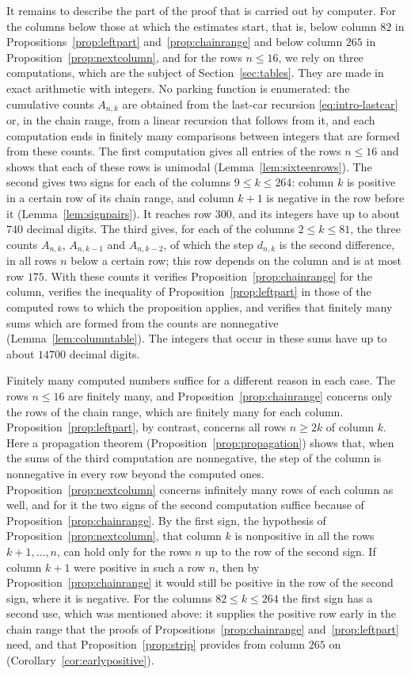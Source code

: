 \documentclass{amsart}
\theoremstyle{definition}
\theoremstyle{remark}
\numberwithin{equation}{section}
\begin{document}
It remains to describe the part of the proof that is carried out by computer. For the columns below those at which the estimates start, that is, below column $82$ in Propositions~\ref{prop:leftpart} and~\ref{prop:chainrange} and below column $265$ in Proposition~\ref{prop:nextcolumn}, and for the rows $n\le 16$, we rely on three computations, which are the subject of Section~\ref{sec:tables}. They are made in exact arithmetic with integers. No parking function is enumerated: the cumulative counts $A_{n,k}$ are obtained from the last-car recursion \eqref{eq:intro-lastcar} or, in the chain range, from a linear recursion that follows from it, and each computation ends in finitely many comparisons between integers that are formed from these counts. The first computation gives all entries of the rows $n\le 16$ and shows that each of these rows is unimodal (Lemma~\ref{lem:sixteenrows}). The second gives two signs for each of the columns $9\le k\le 264$: column $k$ is positive in a certain row of its chain range, and column $k+1$ is negative in the row before it (Lemma~\ref{lem:signpairs}). It reaches row $300$, and its integers have up to about $740$ decimal digits. The third gives, for each of the columns $2\le k\le 81$, the three counts $A_{n,k}$, $A_{n,k-1}$ and $A_{n,k-2}$, of which the step $d_{n,k}$ is the second difference, in all rows $n$ below a certain row; this row depends on the column and is at most row $175$. With these counts it verifies Proposition~\ref{prop:chainrange} for the column, verifies the inequality of Proposition~\ref{prop:leftpart} in those of the computed rows to which the proposition applies, and verifies that finitely many sums which are formed from the counts are nonnegative (Lemma~\ref{lem:columntable}). The integers that occur in these sums have up to about $14700$ decimal digits.

Finitely many computed numbers suffice for a different reason in each case. The rows $n\le 16$ are finitely many, and Proposition~\ref{prop:chainrange} concerns only the rows of the chain range, which are finitely many for each column. Proposition~\ref{prop:leftpart}, by contrast, concerns all rows $n\ge 2k$ of column $k$. Here a propagation theorem (Proposition~\ref{prop:propagation}) shows that, when the sums of the third computation are nonnegative, the step of the column is nonnegative in every row beyond the computed ones. Proposition~\ref{prop:nextcolumn} concerns infinitely many rows of each column as well, and for it the two signs of the second computation suffice because of Proposition~\ref{prop:chainrange}. By the first sign, the hypothesis of Proposition~\ref{prop:nextcolumn}, that column $k$ is nonpositive in all the rows $k+1,\dots,n$, can hold only for the rows $n$ up to the row of the second sign. If column $k+1$ were positive in such a row $n$, then by Proposition~\ref{prop:chainrange} it would still be positive in the row of the second sign, where it is negative. For the columns $82\le k\le 264$ the first sign has a second use, which was mentioned above: it supplies the positive row early in the chain range that the proofs of Propositions~\ref{prop:chainrange} and~\ref{prop:leftpart} need, and that Proposition~\ref{prop:strip} provides from column $265$ on (Corollary~\ref{cor:earlypositive}).
\end{document}
